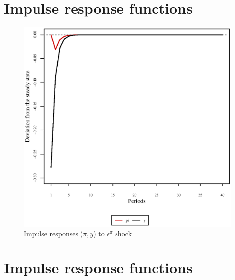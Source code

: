 \pagebreak

\section{Impulse response functions}

\begin{figure}[h]
\centering
\begin{minipage}{0.5\textwidth}
\vspace*{-3em}
\centering
\includegraphics[width=0.99\textwidth, scale=0.55]{plots/plot_31.eps}
\caption{Impulse responses ($\pi, y$) to $\epsilon^{\pi}$ shock}
\end{minipage}
\end{figure}

\pagebreak

\section{Impulse response functions}

